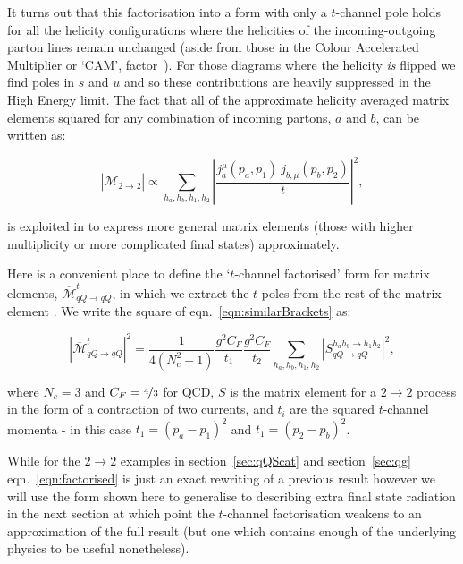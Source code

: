 		It turns out that this factorisation into a form with only a $t$-channel pole holds for
		all the helicity configurations where the helicities of the incoming-outgoing parton lines
		remain unchanged (aside from those in the Colour Accelerated Multiplier or `CAM',
		factor~\cite{Andersen:2009he}).  For those diagrams where the helicity \emph{is} flipped we find poles
		in $s$ and $u$ and so these contributions are heavily suppressed in the High Energy limit.
		The fact that all of the approximate helicity averaged matrix elements squared for any
		combination of incoming partons, $a$ and $b$, can be written as:

		\begin{equation}
			|\bar{\mathcal{M}}_{2\to2}| \propto \sum_{h_a, h_b, h_1, h_2}
			\left|\frac{j^\mu_a(p_a, p_1)\ j_{b, \mu}(p_b, p_2)}{t}\right|^2,
		\end{equation}

		is exploited in \hej to express more general matrix elements (those with higher multiplicity or
		more complicated final states) approximately.

		Here is a convenient place to define the `$t$-channel factorised' form for matrix elements,
		$\overline{\mathcal{M}}^t_{qQ\rightarrow qQ}$, in which we extract the $t$ poles from the
		rest of the matrix element \cite{Andersen:2009nu}.  We write the square of
		eqn.~\eqref{eqn:similarBrackets} as:

		\begin{equation}
			|\overline{\mathcal{M}}^t_{qQ\rightarrow qQ}|^2 = \frac{1}{4(N_c^2-1)}
			\frac{g^2C_F}{t_1}\frac{g^2C_F}{t_2} \sum_{h_a, h_b, h_1, h_2}
			|S_{qQ\rightarrow qQ}^{h_ah_b\rightarrow h_1h_2}|^2,
			\label{eqn:factorised}
		\end{equation}

		where $N_c=3$ and $C_F=\nicefrac{4}{3}$ for QCD, $S$ is the matrix element for a $2\rightarrow2$ process
		in the form of a contraction of two currents, and $t_i$ are the squared $t$-channel momenta - in this
		case $t_1=(p_a-p_1)^2$ and $t_1=(p_2-p_b)^2$.

		While for the $2\to2$ examples in section~\eqref{sec:qQScat} and section~\eqref{sec:qg} eqn.~\eqref{eqn:factorised}
		is just an exact rewriting of a previous result however we will use the form shown here to generalise to describing
		extra final state radiation in the next section at which point the $t$-channel factorisation weakens to
		an approximation of the full result (but one which contains enough of the underlying physics to be useful
		nonetheless).

